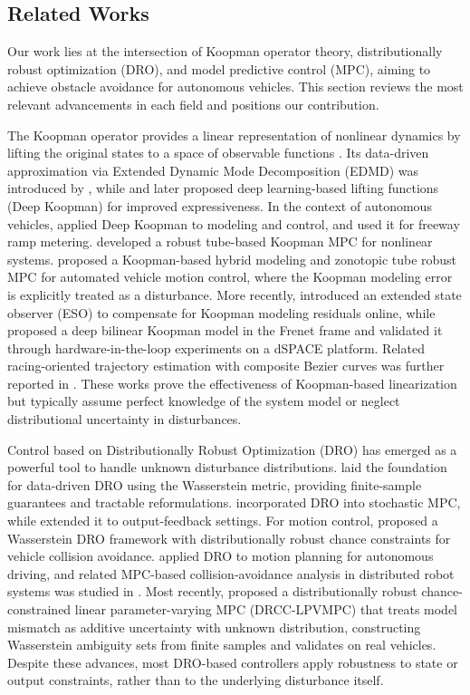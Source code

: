 \documentclass[pdflatex,sn-mathphys,Numbered]{sn-jnl}
\numberwithin{equation}{section}
\begin{document}
	\subsection{Related Works}
	\label{subsec:related}
	
	Our work lies at the intersection of Koopman operator theory, distributionally robust optimization (DRO), and model predictive control (MPC), aiming to achieve obstacle avoidance for autonomous vehicles. This section reviews the most relevant advancements in each field and positions our contribution.
	
	The Koopman operator provides a linear representation of nonlinear dynamics by lifting the original states to a space of observable functions \citep{koopman1931}. Its data-driven approximation via Extended Dynamic Mode Decomposition (EDMD) was introduced by \citet{williams2015}, while \citet{lusch2018} and \citet{shi2022} later proposed deep learning-based lifting functions (Deep Koopman) for improved expressiveness. In the context of autonomous vehicles, \citet{xiao2022} applied Deep Koopman to modeling and control, and \citet{wu2023} used it for freeway ramp metering. \citet{zhang2022} developed a robust tube-based Koopman MPC for nonlinear systems. \citet{zheng2024} proposed a Koopman-based hybrid modeling and zonotopic tube robust MPC for automated vehicle motion control, where the Koopman modeling error is explicitly treated as a disturbance. More recently, \citet{chenlv2024} introduced an extended state observer (ESO) to compensate for Koopman modeling residuals online, while \citet{abtahi2025} proposed a deep bilinear Koopman model in the Frenet frame and validated it through hardware-in-the-loop experiments on a dSPACE platform. Related racing-oriented trajectory estimation with composite Bezier curves was further reported in \citet{weiss2026}. These works prove the effectiveness of Koopman-based linearization but typically assume perfect knowledge of the system model or neglect distributional uncertainty in disturbances.
	
	Control based on Distributionally Robust Optimization (DRO) has emerged as a powerful tool to handle unknown disturbance distributions. \citet{esfahani2018} laid the foundation for data-driven DRO using the Wasserstein metric, providing finite-sample guarantees and tractable reformulations. \citet{li2021} incorporated DRO into stochastic MPC, while \citet{li2023} extended it to output-feedback settings. For motion control, \citet{hakobyan2023} proposed a Wasserstein DRO framework with distributionally robust chance constraints for vehicle collision avoidance. \citet{chen2024} applied DRO to motion planning for autonomous driving, and related MPC-based collision-avoidance analysis in distributed robot systems was studied in \citet{vangasse2024}. Most recently, \citet{fang2026} proposed a distributionally robust chance-constrained linear parameter-varying MPC (DRCC-LPVMPC) that treats model mismatch as additive uncertainty with unknown distribution, constructing Wasserstein ambiguity sets from finite samples and validates on real vehicles. Despite these advances, most DRO-based controllers apply robustness to state or output constraints, rather than to the underlying disturbance itself.
	
\end{document}
